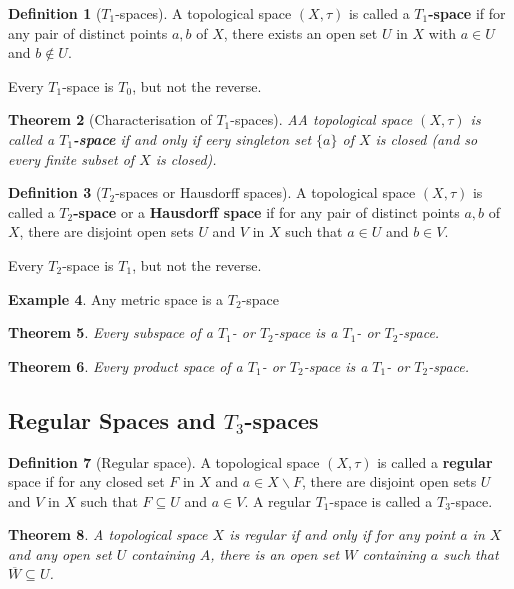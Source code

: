 \documentclass[10pt, oneside, reqno]{amsart}
\theoremstyle{plain}%
\newtheorem{thm}{Theorem}[section]
\theoremstyle{definition}
\newtheorem{defn}[thm]{Definition}
\newtheorem{exmp}[thm]{Example}
\theoremstyle{remark}
\newcommand{\topo}{(X,\tau)}
\newcommand{\ol}[1]{\overline{#1}}
\begin{document}
\begin{defn}[$T_1$-spaces]
A topological space $\topo$ is called a \textbf{$T_1$-space} if for any pair of distinct points $a,b$ of $X$, there exists an open set $U $ in $X$ with $a \in U$ and $b \notin U$.
\end{defn}

Every $T_1$-space is $T_0$, but not the reverse.

\begin{thm}[Characterisation of $T_1$-spaces]
	AA topological space $\topo$ is called a \textbf{$T_1$-space} if and only if eery singleton set $\{ a \}$ of $X$ is closed (and so every finite subset of $X$ is closed).
\end{thm}
	
\begin{defn}[$T_2$-spaces or Hausdorff spaces]
	A topological space $\topo$ is called a \textbf{$T_2$-space} or a \textbf{Hausdorff space} if for any pair of distinct points $a,b$ of $X$, there are disjoint open sets $U$ and $V$ in $X$ such that $a \in U$ and $b \in V$.
\end{defn}

Every $T_2$-space is $T_1$, but not the reverse.

\begin{exmp}
	Any metric space is a $T_2$-space
\end{exmp}
	
\begin{thm}
	Every subspace of a $T_1$- or $T_2$-space is a $T_1$- or $T_2$-space. 
\end{thm}

\begin{thm}
	Every product space of a $T_1$- or $T_2$-space is a $T_1$- or $T_2$-space. 
\end{thm}

\subsection{Regular Spaces and $T_3$-spaces} %
\label{sub:regular_spaces}

\begin{defn}[Regular space]
	A topological space $\topo$ is called a \textbf{regular} space if for any closed set $F$ in $X$ and $a \in X \backslash F$, there are disjoint open sets $U$ and $V$ in $X$ such that $F \subseteq U$ and $a \in V$.  A regular $T_1$-space is called a $T_3$-space.
\end{defn}

\begin{thm}
	A topological space $X$ is regular if and only if for any point $a$ in $X$ and any open set $U$ containing $A$, there is an open set $W$ containing $a$ such that $\ol W \subseteq U$.

\end{thm}
\end{document}
